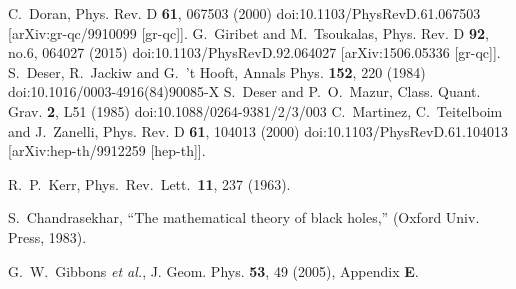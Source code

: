 \documentclass[preprint,aps,tightenlines,showkeys,nofootinbib,superscriptaddress,amsmath]{revtex4}
\begin{document}
\begin{thebibliography}{999}

C.~Doran,
Phys. Rev. D \textbf{61}, 067503 (2000)
doi:10.1103/PhysRevD.61.067503
[arXiv:gr-qc/9910099 [gr-qc]].
G.~Giribet and M.~Tsoukalas,
Phys. Rev. D \textbf{92}, no.6, 064027 (2015)
doi:10.1103/PhysRevD.92.064027
[arXiv:1506.05336 [gr-qc]].
S.~Deser, R.~Jackiw and G.~'t Hooft,
Annals Phys. \textbf{152}, 220 (1984)
doi:10.1016/0003-4916(84)90085-X
S.~Deser and P.~O.~Mazur,
Class. Quant. Grav. \textbf{2}, L51 (1985)
doi:10.1088/0264-9381/2/3/003
C.~Martinez, C.~Teitelboim and J.~Zanelli,
Phys. Rev. D \textbf{61}, 104013 (2000)
doi:10.1103/PhysRevD.61.104013
[arXiv:hep-th/9912259 [hep-th]].

R.~P.~Kerr,
Phys.\ Rev.\ Lett.\  {\bf 11}, 237 (1963).

S.~Chandrasekhar,
``The mathematical theory of black holes,'' (Oxford Univ.
Press, 1983).


G.~W.~Gibbons \textit{et al.},
J. Geom. Phys. \textbf{53}, 49
(2005), Appendix {\bf E}.

\end{thebibliography}
\end{document}
